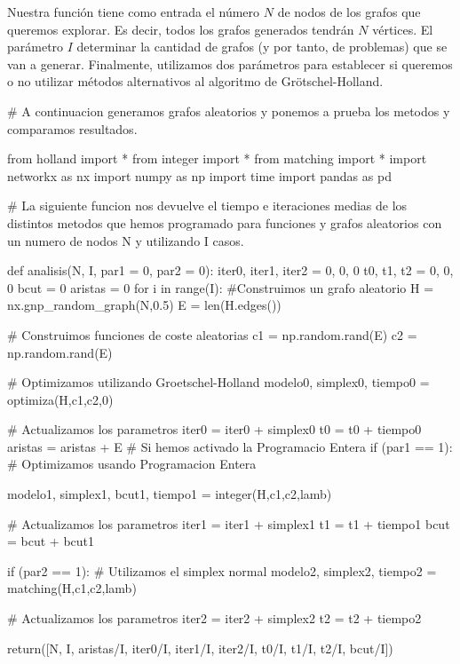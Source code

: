 \documentclass[twoside,a4paper,openright,12pt]{book}
\begin{document}
Nuestra función tiene como entrada el número $N$ de nodos de los grafos que queremos explorar. Es decir, todos los grafos generados tendrán $N$ vértices. El parámetro $I$ determinar la cantidad de grafos (y por tanto, de problemas) que se van a generar. Finalmente, utilizamos dos parámetros para establecer si queremos o no utilizar métodos alternativos al algoritmo de Grötschel-Holland. 
\begin{pythone}
# A continuacion generamos grafos aleatorios y ponemos a prueba los metodos y comparamos resultados.

from holland import *
from integer import *
from matching import *
import networkx as nx
import numpy as np
import time
import pandas as pd

# La siguiente funcion nos devuelve el tiempo e iteraciones medias de los distintos metodos que hemos programado para funciones y grafos aleatorios con un numero de nodos N y utilizando I casos.

def analisis(N, I, par1 = 0, par2 = 0):
    iter0, iter1, iter2 = 0, 0, 0
    t0, t1, t2 = 0, 0, 0
    bcut = 0
    aristas = 0
    for i in range(I):
        #Construimos un grafo aleatorio
        H = nx.gnp_random_graph(N,0.5)
        E = len(H.edges())
        
        # Construimos funciones de coste aleatorias
        c1 = np.random.rand(E)
        c2 = np.random.rand(E)
        
        # Optimizamos utilizando Groetschel-Holland
        modelo0, simplex0, tiempo0 = optimiza(H,c1,c2,0)
        
        # Actualizamos los parametros
        iter0 = iter0 + simplex0
        t0 = t0 + tiempo0
        aristas = aristas + E
        # Si hemos activado la Programacio Entera
        if (par1 == 1):
            # Optimizamos usando Programacion Entera

            modelo1, simplex1, bcut1, tiempo1 = integer(H,c1,c2,lamb)

            # Actualizamos los parametros
            iter1 = iter1 + simplex1
            t1 = t1 + tiempo1
            bcut = bcut + bcut1
        
        if (par2 == 1):
            # Utilizamos el simplex normal
            modelo2, simplex2, tiempo2 = matching(H,c1,c2,lamb)
            
            # Actualizamos los parametros
            iter2 = iter2 + simplex2
            t2 = t2 + tiempo2
        
    return([N, I, aristas/I, iter0/I,  iter1/I, iter2/I,  
            t0/I, t1/I, t2/I, bcut/I])
      
\end{pythone}
\newpage 
\end{document}
